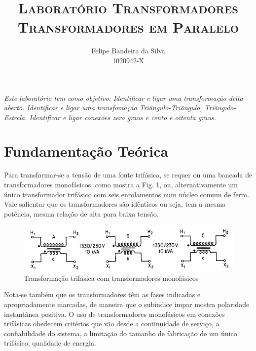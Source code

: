 \documentclass[paper=a4, fontsize=11pt]{article}
\title{\textsc{Laboratório Transformadores\\Transformadores em Paralelo}}
\author{Felipe Bandeira da Silva\\1020942-X}
\begin{document}
\maketitle


\textit{Este laboratório tem como objetivo: Identificar e ligar uma transformação delta aberto. Identificar e ligar uma transfomação Triângulo-Triângulo, Triângulo-Estrela. Identificar e ligar conexões zero graus e cento e oitenta graus.}

\newpage

\tableofcontents

\newpage

\listoffigures


\newpage
\section{Fundamentação Teórica}

Para transformar-se a tensão de uma fonte trifásica, se requer ou uma bancada de
transformadores monofásicos, como mostra a Fig. 1, ou, alternativamente um único
transformador trifásico com seis enrolamentos num núcleo comum de ferro. Vale 
salientar que os transformadores são idênticos ou seja, tem a mesma potência, mesma
relação de alta para baixa tensão.

\begin{figure}[!ht]
    \centering
    \includegraphics[scale=.6]{mono3}
    \caption{Transformação trifásica com transformadores monofásicos}
\end{figure}

Nota-se também que os transformadores têm as fases indicadas e apropriadamente marcadas,
de maneira que o subíndice impar mostra polaridade instantânea positiva. 
O uso de transformadores monofásicos em conexões trifásicas obedecem critérios que 
vão desde a continuidade de serviço, a confiabilidade do sistema, a limitação
do tamanho de fabricação de um único trifásico, qualidade de energia.
\end{document}
